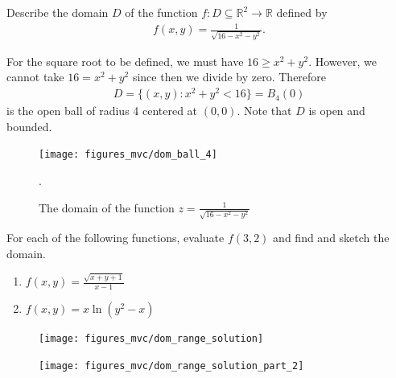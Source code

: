 \documentclass[12pt,letterpaper,reqno]{article}
\numberwithin{equation}{section}
\newcommand{\R}{\ensuremath{\mathbb R}}
\begin{document}
{\begin{exercise}
Describe the domain $D$ of the function $f:D \subseteq \R^2 \to \R$ defined by 
\begin{align*}
	f(x,y)=\frac{1}{\sqrt{16-x^2-y^2}}.
\end{align*}	
\end{exercise}

{\color{red}
\begin{solution}
	For the square root to be defined, we must have $16 \geq x^2+y^2$. However, we cannot take $16=x^2+y^2$ since then we divide by zero. Therefore
	\begin{align*}
		D=\{(x,y):x^2+y^2<16\}=B_4(0)
	\end{align*}
	is the open ball of radius 4 centered at $(0,0)$. Note that $D$ is open and bounded.
	\begin{figure}[h]
		\begin{center}
			\texttt{[image: figures\_mvc/dom\_ball\_4]}
		\end{center}
		\caption{The domain of the function $z=\frac{1}{\sqrt{16-x^2-y^2}}$}.
	\end{figure}
\end{solution}}

\begin{exercise}
For each of the following functions, evaluate $f(3,2)$ and find and sketch the domain.
\begin{enumerate}
	\item $f(x,y)=\frac{\sqrt{x+y+1}}{x-1}$
	\item $f(x,y)=x\ln(y^2-x)$
\end{enumerate} 	
\end{exercise}

\begin{figure}[h]
	\begin{center}
	\texttt{[image: figures\_mvc/dom\_range\_solution]}
\end{center}
\end{figure}

\begin{figure}[h]
	\begin{center}
	\texttt{[image: figures\_mvc/dom\_range\_solution\_part\_2]}
\end{center}
\end{figure}
}
\end{document}
